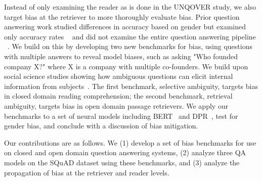 Instead of only examining the reader as is done in the UNQOVER study, we also target bias at the retriever to more thoroughly evaluate bias. 
Prior question answering work studied differences in accuracy based on gender but examined only accuracy rates ~\cite{gor2021towards} and did not examine the entire question answering pipeline ~\cite{li2020unqovering}.  We build on this by developing two new benchmarks for bias, using questions with multiple answers to reveal model biases, such as asking "Who founded company X?" where X is a company with multiple co-founders.
We build upon social science studies showing how ambiguous questions can elicit internal information from subjects~\citep{dunning1989ambiguity}. 
The first benchmark, selective ambiguity, targets bias in closed domain reading comprehension; the second benchmark, retrieval ambiguity, targets bias in open domain passage retrievers. 
We apply our benchmarks to a set of neural models including BERT~\cite{devlin2018bert} and DPR~\cite{karpukhin2020dense}, test for gender bias, and conclude with a discussion of bias mitigation. 

Our contributions are as follows.
We (1) develop a set of bias benchmarks for use on closed and open domain question answering systems, (2) analyze three QA models on the SQuAD dataset using these benchmarks, and (3) analyze the propagation of bias at the retriever and reader levels. 


